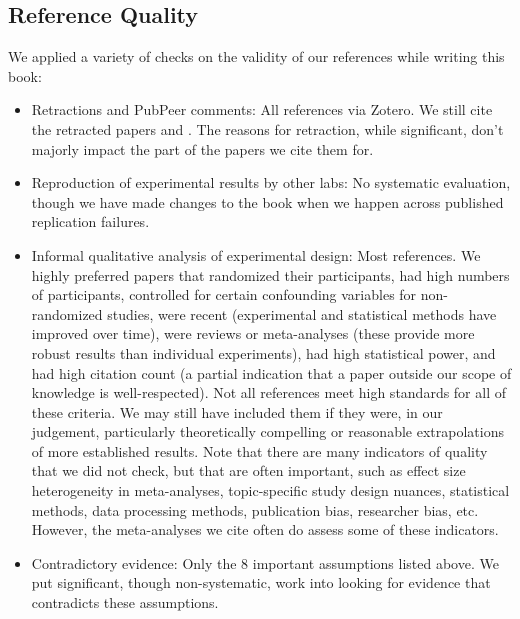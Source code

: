 \documentclass[12pt,letterpaper]{book}
\begin{document}
\subsection*{Reference Quality}
We applied a variety of checks on the validity of our references while writing this book:
\begin{itemize}
    \item Retractions and PubPeer comments: All references via Zotero. We still cite the retracted papers \textcite{jeromeMDMALongTerm} and \textcite{feducciaSSRIDiscontinuation}. The reasons for retraction, while significant, don't majorly impact the part of the papers we cite them for.
    \item Reproduction of experimental results by other labs: No systematic evaluation, though we have made changes to the book when we happen across published replication failures.
    \item Informal qualitative analysis of experimental design: Most references. We highly preferred papers that randomized their participants, had high numbers of participants, controlled for certain confounding variables for non-randomized studies, were recent (experimental and statistical methods have improved over time), were reviews or meta-analyses (these provide more robust results than individual experiments), had high statistical power, and had high citation count (a partial indication that a paper outside our scope of knowledge is well-respected). Not all references meet high standards for all of these criteria. We may still have included them if they were, in our judgement, particularly theoretically compelling or reasonable extrapolations of more established results. Note that there are many indicators of quality that we did not check, but that are often important, such as effect size heterogeneity in meta-analyses, topic-specific study design nuances, statistical methods, data processing methods, publication bias, researcher bias, etc. However, the meta-analyses we cite often do assess some of these indicators.
    \item Contradictory evidence: Only the 8 important assumptions listed above. We put significant, though non-systematic, work into looking for evidence that contradicts these assumptions.
\end{itemize}
\end{document}
